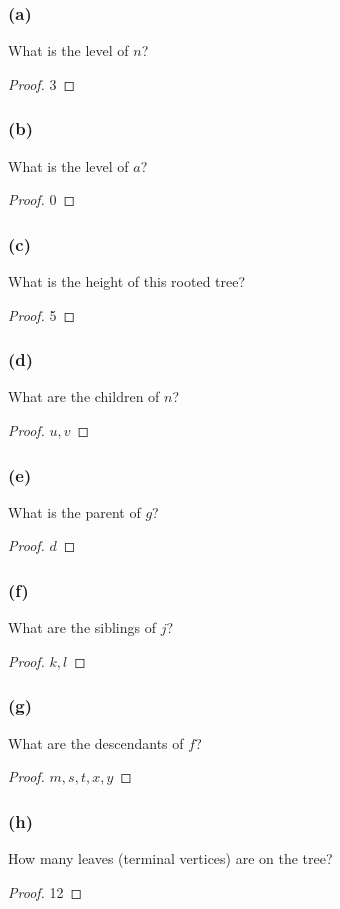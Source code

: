 \documentclass[14pt]{extarticle}
\begin{document}
\subsubsection{(a)}
What is the level of \(n\)?
\begin{proof}
3 
\end{proof}

\subsubsection{(b)}
What is the level of \(a\)?
\begin{proof}
0
\end{proof}

\subsubsection{(c)}
What is the height of this rooted tree?
\begin{proof}
5
\end{proof}

\subsubsection{(d)}
What are the children of \(n\)?
\begin{proof}
\(u, v\)
\end{proof}

\subsubsection{(e)}
What is the parent of \(g\)?
\begin{proof}
\(d\)
\end{proof}

\subsubsection{(f)}
What are the siblings of \(j\)?
\begin{proof}
\(k, l\)
\end{proof}

\subsubsection{(g)}
What are the descendants of \(f\)?
\begin{proof}
\(m, s, t, x, y\)
\end{proof}

\subsubsection{(h)}
How many leaves (terminal vertices) are on the tree?
\begin{proof}
12
\end{proof}
\end{document}
